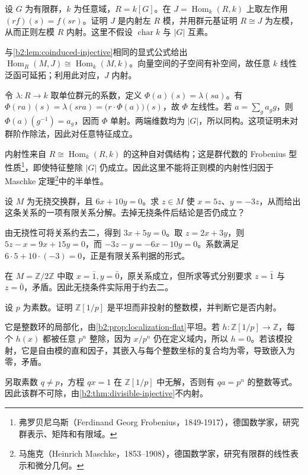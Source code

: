 \begin{exercise}\label{b2:ex:07-group-algebra-injective}
	设 \(G\) 为有限群，\(k\) 为任意域，\(R=k[G]\)。在 \(J=\operatorname{Hom}_k(R,k)\) 上取左作用 \((rf)(s)=f(sr)\)。证明 \(J\) 是内射左 \(R\) 模，并用群元基证明 \(R\cong J\) 为左模，从而正则左模 \(R\) 内射。这里不假设 \(\operatorname{char}k\) 与 \(|G|\) 互素。
\end{exercise}
\begin{solution}
	与\cref{b2:lem:coinduced-injective}相同的显式公式给出 \(\operatorname{Hom}_R(M,J)\cong\operatorname{Hom}_k(M,k)\)。向量空间的子空间有补空间，故任意 \(k\) 线性泛函可延拓；利用此对应，\(J\) 内射。

	令 \(\lambda:R\to k\) 取单位群元的系数，定义 \(\Phi(a)(s)=\lambda(sa)\)。有 \(\Phi(ra)(s)=\lambda(sra)=\bigl(r\cdot\Phi(a)\bigr)(s)\)，故 \(\Phi\) 左线性。若 \(a=\sum_g a_g g\)，则 \(\Phi(a)(g^{-1})=a_g\)，因而 \(\Phi\) 单射。两端维数均为 \(|G|\)，所以同构。这项证明未对群阶作除法，因此对任意特征成立。

	内射性来自 \(R\cong\operatorname{Hom}_k(R,k)\) 的这种自对偶结构；这是群代数的 Frobenius 型性质\footnote{弗罗贝尼乌斯（Ferdinand Georg Frobenius，1849-1917），德国数学家，研究群表示、矩阵和有限域。}，即使特征整除 \(|G|\) 仍成立。因此这里不能将正则模的内射性归因于 Maschke 定理\footnote{马施克（Heinrich Maschke，1853--1908），德国数学家，研究有限群的线性表示和微分几何。}中的半单性。
\end{solution}

\begin{exercise}\label{b2:ex:07-integer-relation}
	设 \(M\) 为无挠交换群，且 \(6x+10y=0\)。求 \(z\in M\) 使 \(x=5z\)、\(y=-3z\)，从而给出这条关系的一项有限关系分解。去掉无挠条件后结论是否仍成立？
\end{exercise}
\begin{solution}
	由无挠性可将关系约去二，得到 \(3x+5y=0\)。取 \(z=2x+3y\)，则 \(5z-x=9x+15y=0\)，而 \(-3z-y=-6x-10y=0\)。系数满足 \(6\cdot5+10\cdot(-3)=0\)，正是有限关系判据的形式。

	在 \(M=\mathbb Z/2\mathbb Z\) 中取 \(x=\bar1,y=\bar0\)，原关系成立，但所求等式分别要求 \(z=\bar1\) 与 \(z=\bar0\)，矛盾。因此无挠条件实际用于约去二。
\end{solution}

\begin{exercise}\label{b2:ex:07-localization-nonprojective}
	设 \(p\) 为素数。证明 \(\mathbb Z[1/p]\) 是平坦而非投射的整数模，并判断它是否内射。
\end{exercise}
\begin{solution}
	它是整数环的局部化，由\cref{b2:prop:localization-flat}平坦。若 \(h:\mathbb Z[1/p]\to\mathbb Z\)，每个 \(h(x)\) 都被任意 \(p^n\) 整除，因为 \(x/p^n\) 仍在定义域内，所以 \(h=0\)。若该模投射，它是自由模的直和因子，其嵌入与每个整数坐标的复合均为零，导致嵌入为零，矛盾。

	另取素数 \(q\ne p\)，方程 \(qx=1\) 在 \(\mathbb Z[1/p]\) 中无解，否则有 \(q a=p^n\) 的整数等式。因此该群不可除，由\cref{b2:thm:divisible-injective}不内射。
\end{solution}

